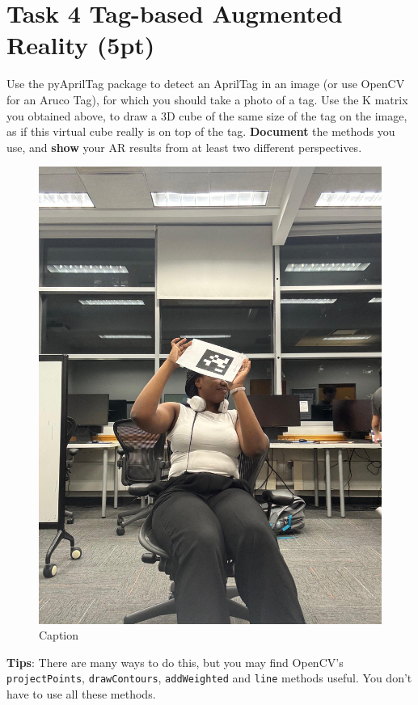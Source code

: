 \documentclass[english]{article}
\begin{document}
\clearpage

\section{Task 4 Tag-based Augmented Reality (5pt)}
Use the pyAprilTag package to detect an AprilTag in an image (or use OpenCV for an Aruco Tag), for which you should take a photo of a tag. Use the K matrix you obtained above, to draw a 3D cube of the same size of the tag on the image, as if this virtual cube really is on top of the tag. \textbf{Document} the methods you use, and \textbf{show} your AR results from at least two different perspectives.
\begin{figure}[h]
    \centering
    \includegraphics[scale = 0.2]{figs/task4_tag.jpg}
    \caption{Caption}
    \label{fig:tag before AR}
\end{figure}


\textbf{Tips}: There are many ways to do this, but you may find OpenCV's \texttt{projectPoints}, \texttt{drawContours}, \texttt{addWeighted} and \texttt{line} methods useful. You don't have to use all these methods.
\end{document}
